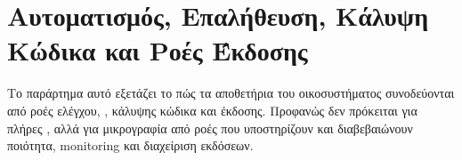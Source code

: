\chapter{Αυτοματισμός, Επαλήθευση, Κάλυψη Κώδικα και Ροές Έκδοσης}
\label{app:automation_verification}

Το παράρτημα αυτό εξετάζει το πώς τα αποθετήρια του οικοσυστήματος συνοδεύονται από ροές ελέγχου, ,
κάλυψης κώδικα και έκδοσης. Προφανώς δεν πρόκειται για πλήρες ,
αλλά για μικρογραφία από ροές που υποστηρίζουν και διαβεβαιώνουν ποιότητα, monitoring και διαχείριση εκδόσεων.



